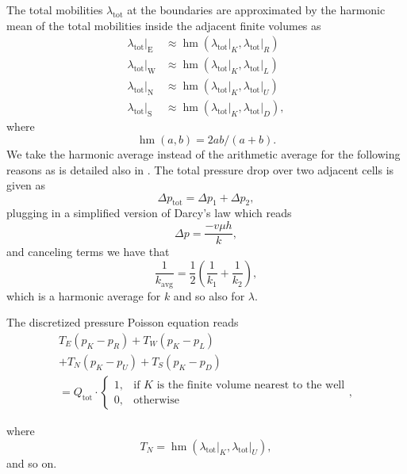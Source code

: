 \documentclass[conference]{IEEEtran}
\DeclareMathOperator*{\hmean}{hm}
\begin{document}
The total mobilities $\lambda_\text{tot}$ at the boundaries are approximated by the harmonic mean of the total mobilities inside the adjacent finite volumes as
\begin{align}
\label{harmonicMeans}
\lambda_\text{tot}\lvert_\text{E} &\approx \hmean(\lambda_\text{tot}\lvert_K, \lambda_\text{tot}\lvert_R) \\
\lambda_\text{tot}\lvert_\text{W} &\approx \hmean(\lambda_\text{tot}\lvert_K, \lambda_\text{tot}\lvert_L) \\
\lambda_\text{tot}\lvert_\text{N} &\approx \hmean(\lambda_\text{tot}\lvert_K, \lambda_\text{tot}\lvert_U) \\
\lambda_\text{tot}\lvert_\text{S} &\approx \hmean(\lambda_\text{tot}\lvert_K, \lambda_\text{tot}\lvert_D),
\end{align}
where \begin{equation}
\hmean(a, b) = 2ab/(a+b).
\end{equation}
We take the harmonic average instead of the arithmetic average for the following reasons as is detailed also in \cite{perminc}.
The total pressure drop over two adjacent cells is given as
\begin{equation}
\Delta p_\text{tot} = \Delta p_1 + \Delta p_2,
\end{equation}
plugging in a simplified version of Darcy's law which reads
\begin{equation}
\Delta p  = \frac{-v\mu h}{k},
\end{equation}
and canceling terms we have that
\begin{equation}
\frac{1}{k_\text{avg}} = \frac{1}{2}\left(\frac{1}{k_1} + \frac{1}{k_2}\right),
\end{equation}
which is a harmonic average for $k$ and so also for $\lambda.$

The discretized pressure Poisson equation reads
\begin{multline}
T_E (p_K - p_R) + T_W (p_K - p_L) \\+ T_N ( p_K - p_U) + T_S (p_K - p_D) \\= {Q_\text{tot}} \cdot \begin{cases} 1, &\text{if } K \text{ is the finite volume nearest to the well} \\
0, & \text{otherwise} \end{cases},
\end{multline}

where \begin{equation}
T_N = \hmean(\lambda_\text{tot}\lvert_K, \lambda_\text{tot}\lvert_U),
\end{equation}
and so on.
\end{document}
